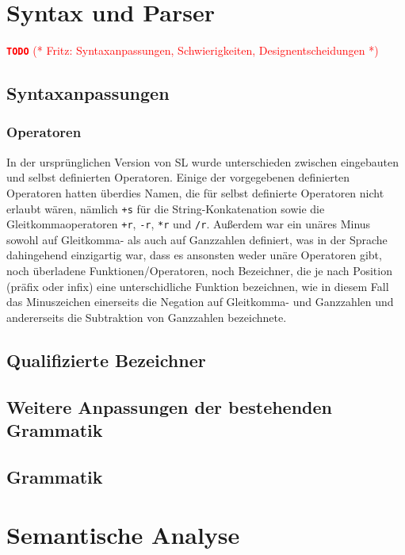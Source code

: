 \documentclass[runningheads]{llncs}
\newcommand{\TODO}[1]{ \textcolor{red}{\textbf{\texttt{\large{TODO}}} (* #1 *)}\par}
\begin{document}
\section{Syntax und Parser}\label{sec:syntax}

\TODO{Fritz: Syntaxanpassungen, Schwierigkeiten, Designentscheidungen}
\subsection{Syntaxanpassungen}

\subsubsection{Operatoren}

In der ursprünglichen Version von SL wurde unterschieden zwischen
eingebauten und selbst definierten Operatoren. Einige der vorgegebenen
definierten Operatoren hatten überdies Namen, die für selbst
definierte Operatoren nicht erlaubt wären, nämlich \verb|+s| für die
String-Konkatenation sowie die Gleitkommaoperatoren \verb|+r|,
\verb|-r|, \verb|*r| und \verb|/r|. Außerdem war ein unäres Minus
sowohl auf Gleitkomma- als auch auf Ganzzahlen definiert, was in der
Sprache dahingehend einzigartig war, dass es ansonsten weder unäre
Operatoren gibt, noch überladene Funktionen/Operatoren, noch
Bezeichner, die je nach Position (präfix oder infix) eine
unterschidliche Funktion bezeichnen, wie in diesem Fall das
Minuszeichen einerseits die Negation auf Gleitkomma- und Ganzzahlen
und andererseits die Subtraktion von Ganzzahlen bezeichnete.

\subsection{Qualifizierte Bezeichner}

\subsection{Weitere Anpassungen der bestehenden Grammatik}
\label{sec:syntaxAdjustments}

\subsection{Grammatik}

\section{Semantische Analyse}\label{sec:semantics}
\end{document}
